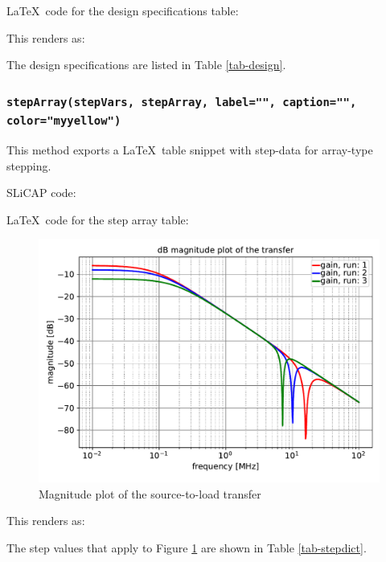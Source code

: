 \documentclass[a4paper,12pt]{article}
\begin{document}
\LaTeX$\,$ code for the design specifications table:



This renders as:

The design specifications are listed in Table \ref{tab-design}.



\subsubsection{\texttt{stepArray(stepVars, stepArray, label="", caption="", \\ color="myyellow")}}

This method exports a \LaTeX$\,$ table snippet with step-data for array-type stepping.

SLiCAP code:



\LaTeX$\,$ code for the step array table:



\begin{figure}[H]
\centering
 \includegraphics[width=12cm]{../img/dBmagStepped.pdf}
 \caption{Magnitude plot of the source-to-load transfer}
 \label{fig-dBmagStepped}
\end{figure}

This renders as:

The step values that apply to Figure \ref{fig-dBmagStepped} are shown in Table \ref{tab-stepdict}.


\end{document}
